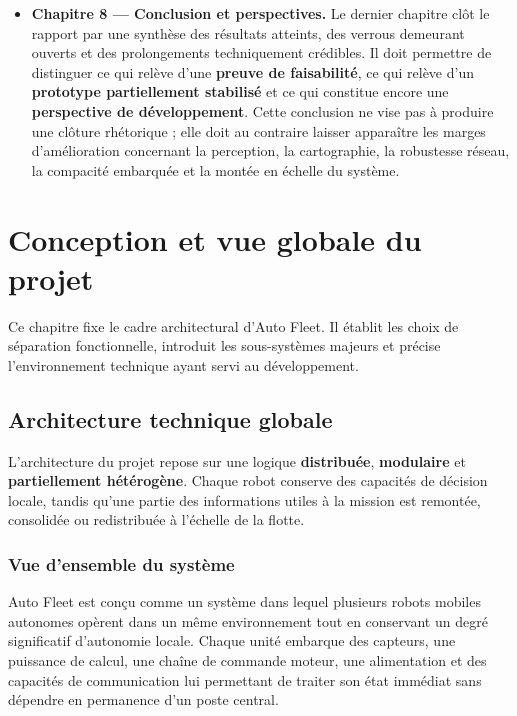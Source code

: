 \documentclass[11pt,a4paper]{report}
\newcommand{\kw}[1]{\textbf{#1}}
\begin{document}
\begin{itemize}[leftmargin=1.2cm]
    \item \kw{Chapitre 8 --- Conclusion et perspectives.}  
    Le dernier chapitre clôt le rapport par une synthèse des résultats atteints, des verrous demeurant ouverts et des prolongements techniquement crédibles. Il doit permettre de distinguer ce qui relève d’une \kw{preuve de faisabilité}, ce qui relève d’un \kw{prototype partiellement stabilisé} et ce qui constitue encore une \kw{perspective de développement}. Cette conclusion ne vise pas à produire une clôture rhétorique ; elle doit au contraire laisser apparaître les marges d’amélioration concernant la perception, la cartographie, la robustesse réseau, la compacité embarquée et la montée en échelle du système.
\end{itemize}

\chapter{Conception et vue globale du projet}

Ce chapitre fixe le cadre architectural d’Auto Fleet. Il établit les choix de séparation fonctionnelle, introduit les sous-systèmes majeurs et précise l’environnement technique ayant servi au développement.

\section{Architecture technique globale}

L’architecture du projet repose sur une logique \kw{distribuée}, \kw{modulaire} et \kw{partiellement hétérogène}. Chaque robot conserve des capacités de décision locale, tandis qu’une partie des informations utiles à la mission est remontée, consolidée ou redistribuée à l’échelle de la flotte.

\subsection{Vue d’ensemble du système}

Auto Fleet est conçu comme un système dans lequel plusieurs robots mobiles autonomes opèrent dans un même environnement tout en conservant un degré significatif d’autonomie locale. Chaque unité embarque des capteurs, une puissance de calcul, une chaîne de commande moteur, une alimentation et des capacités de communication lui permettant de traiter son état immédiat sans dépendre en permanence d’un poste central.
\end{document}

